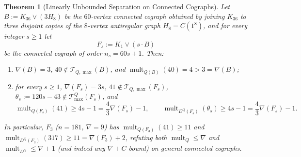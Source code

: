 \documentclass[11pt,a4paper]{article}
\newtheorem{theorem}{Theorem}[section]
\theoremstyle{definition}
\DeclareMathOperator{\mult}{mult}
\begin{document}
\begin{theorem}[Linearly Unbounded Separation on Connected Cographs]\label{thm:cograph_lower}
  Let $B := K_{36} \vee (3 H_8)$ be the $60$-vertex connected cograph obtained by joining $K_{36}$ to three disjoint copies of the $8$-vertex antiregular graph $H_8 = C(1^8)$, and for every integer $s \ge 1$ let
  \[
    F_s := K_1 \vee (s \cdot B)
  \]
  be the connected cograph of order $n_s = 60s + 1$. Then:
  \begin{enumerate}
    \item $\nabla(B) = 3$, $40 \notin \mathcal{T}_{Q,\max}(B)$, and $\mult_{Q(B)}(40) = 4 > 3 = \nabla(B)$;
    \item for every $s \ge 1$, $\nabla(F_s) = 3s$, $41 \notin \mathcal{T}_{Q,\max}(F_s)$, $\theta_s := 120s - 43 \notin \mathcal{T}^Q_{\max}(F_s)$, and
    \[
      \mult_{Q(F_s)}(41) \ge 4s - 1 = \frac{4}{3}\nabla(F_s) - 1, \qquad
      \mult_{D^Q(F_s)}(\theta_s) \ge 4s - 1 = \frac{4}{3}\nabla(F_s) - 1.
    \]
  \end{enumerate}
  In particular, $F_3$ ($n = 181$, $\nabla = 9$) has $\mult_{Q(F_3)}(41) \ge 11$ and $\mult_{D^Q(F_3)}(317) \ge 11 = \nabla(F_3) + 2$, refuting both $\mult_Q \le \nabla$ and $\mult_{D^Q} \le \nabla + 1$ (and indeed any $\nabla + C$ bound) on general connected cographs.
\end{theorem}
\end{document}

